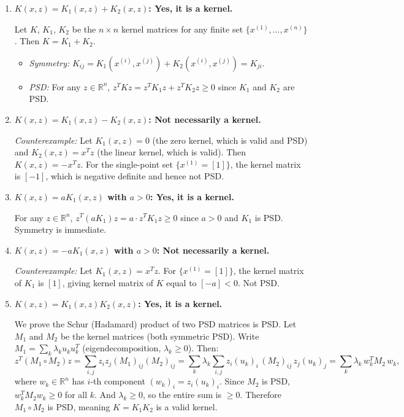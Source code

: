 \begin{answer}

\begin{enumerate}

\item \textbf{$K(x,z) = K_1(x,z) + K_2(x,z)$: Yes, it is a kernel.}

Let $K$, $K_1$, $K_2$ be the $n\times n$ kernel matrices for any finite set $\{x^{(1)},\ldots,x^{(n)}\}$. Then $K = K_1 + K_2$.
\begin{itemize}
  \item \emph{Symmetry:} $K_{ij} = K_1(x^{(i)},x^{(j)}) + K_2(x^{(i)},x^{(j)}) = K_{ji}$.
  \item \emph{PSD:} For any $z\in\mathbb{R}^n$, $z^T K z = z^T K_1 z + z^T K_2 z \geq 0$ since $K_1$ and $K_2$ are PSD.
\end{itemize}

\item \textbf{$K(x,z) = K_1(x,z) - K_2(x,z)$: Not necessarily a kernel.}

\emph{Counterexample:} Let $K_1(x,z) = 0$ (the zero kernel, which is valid and PSD) and $K_2(x,z) = x^Tz$ (the linear kernel, which is valid). Then $K(x,z) = -x^Tz$. For the single-point set $\{x^{(1)}=[1]\}$, the kernel matrix is $[-1]$, which is negative definite and hence not PSD.

\item \textbf{$K(x,z) = aK_1(x,z)$ with $a > 0$: Yes, it is a kernel.}

For any $z\in\mathbb{R}^n$, $z^T(aK_1)z = a\cdot z^TK_1 z \geq 0$ since $a > 0$ and $K_1$ is PSD. Symmetry is immediate.

\item \textbf{$K(x,z) = -aK_1(x,z)$ with $a > 0$: Not necessarily a kernel.}

\emph{Counterexample:} Let $K_1(x,z) = x^Tz$. For $\{x^{(1)}=[1]\}$, the kernel matrix of $K_1$ is $[1]$, giving kernel matrix of $K$ equal to $[-a] < 0$. Not PSD.

\item \textbf{$K(x,z) = K_1(x,z)K_2(x,z)$: Yes, it is a kernel.}

We prove the Schur (Hadamard) product of two PSD matrices is PSD. Let $M_1$ and $M_2$ be the kernel matrices (both symmetric PSD). Write $M_1 = \sum_k \lambda_k u_k u_k^T$ (eigendecomposition, $\lambda_k \geq 0$). Then:
$$z^T(M_1 \circ M_2)z = \sum_{i,j} z_i z_j (M_1)_{ij}(M_2)_{ij} = \sum_k \lambda_k \sum_{i,j} z_i (u_k)_i \,(M_2)_{ij}\, z_j (u_k)_j = \sum_k \lambda_k\, w_k^T M_2\, w_k,$$
where $w_k \in \mathbb{R}^n$ has $i$-th component $(w_k)_i = z_i (u_k)_i$. Since $M_2$ is PSD, $w_k^T M_2 w_k \geq 0$ for all $k$. And $\lambda_k \geq 0$, so the entire sum is $\geq 0$. Therefore $M_1 \circ M_2$ is PSD, meaning $K = K_1 K_2$ is a valid kernel.


\end{enumerate}
\end{answer}
